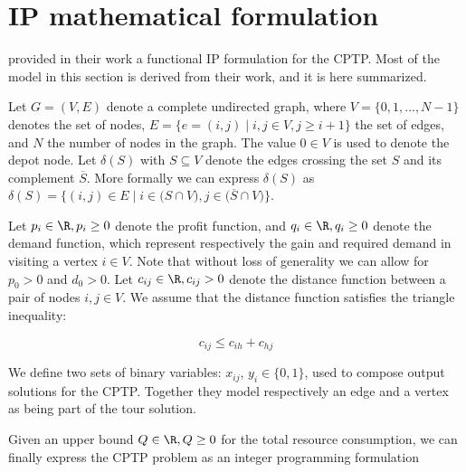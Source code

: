 \chapter{IP mathematical formulation}

\cite{Jepsen2014} provided in their work a functional IP formulation for the CPTP.
Most of the model in this section is derived from their work, and it is here summarized.

Let $G = \left(V, E \right)$ denote a complete undirected graph, where $V = \lbrace 0, 1, \dots, N - 1 \rbrace$ denotes the set of nodes,
$E = \lbrace  e = (i, j) \mid i,j \in V, j \ge i + 1 \rbrace$ the set of edges, and $N$ the number of nodes in the graph.
The value $0 \in V$ is used to denote the depot node.
Let $\delta(S)$ with $S \subseteq V$ denote the edges crossing the set $S$ and its complement $\overline{S}$.
More formally we can express $\delta(S)$ as $\delta(S) = \lbrace (i, j) \in E \mid i \in \lparen S \cap V \rparen, j \in \lparen \overline{S} \cap V \rparen \rbrace$.

Let $p_{i} \in \R, p_{i} \ge 0$ denote the profit function, and $q_{i} \in \R, q_{i} \ge 0$ denote the demand function, which represent respectively the gain and required demand in visiting a vertex $i \in V$.
Note that without loss of generality we can allow for $p_{0} > 0$ and $d_{0} > 0$.
Let $c_{ij} \in \R, c_{ij} > 0$ denote the distance function between a pair of nodes  $i, j \in V$.
We assume that the distance function satisfies the triangle inequality:

\begin{equation}
	c_{ij} \le c_{ih} + c_{hj}
\end{equation}


We define two sets of binary variables: $x_{ij}$, $y_{i} \in \lbrace 0, 1 \rbrace$, used to compose output solutions for the CPTP.
Together they model respectively an edge and a vertex as being part of the tour solution.

Given an upper bound $Q \in \R,Q \ge 0$ for the total resource consumption, we can finally express the CPTP problem as an integer programming formulation


